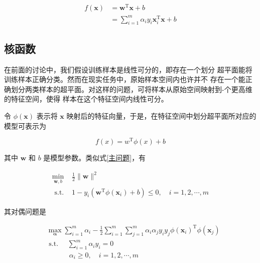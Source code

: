 \documentclass{ctexart}
\begin{document}
	\begin{equation}
		\begin{aligned}
			f(\boldsymbol{x}) &=\boldsymbol{w}^{\mathrm{T}} \boldsymbol{x}+b \\
			&=\sum_{i=1}^{m} \alpha_{i} y_{i} \boldsymbol{x}_{i}^{\mathrm{T}} \boldsymbol{x}+b
		\end{aligned}
	\end{equation}
	
		\subsection{核函数}
	
	在前面的讨论中，我们假设训练样本是线性可分的，即存在一个划分
	超平面能将训练样本正确分类。然而在现实任务中，原始样本空间内也许并不
	存在一个能正确划分两类样本的超平面。对这样的问题，可将样本从原始空间映射到-个更高维的特征空间，使得
	样本在这个特征空间内线性可分。
	
	令 $\phi(\boldsymbol{x})$ 表示将 $\boldsymbol{x}$ 映射后的特征向量，于是，在特征空间中划分超平面所对应的模型可表示为
	
	\begin{equation}
		f(x)=w^{\mathrm{T}} \phi(x)+b
	\end{equation}
	
	其中 $\boldsymbol{w}$ 和 $b$ 是模型参数。类似式\eqref{主问题}，有
	
	\begin{equation}
		\begin{array}{ll}
			\min\limits_{\boldsymbol{w}, b} & \frac{1}{2}\|\boldsymbol{w}\|^{2} \\
			\text { s.t. } &1- y_{i}\left(\boldsymbol{w}^{\mathrm{T}} \phi\left(\boldsymbol{x}_{i}\right)+b\right) \leqslant 0, \quad i=1,2, \cdots, m
		\end{array}
	\end{equation}
	
	其对偶问题是 
	
	\begin{equation}
		\begin{aligned}
			&\max _{\boldsymbol{\alpha}} \sum_{i=1}^{m} \alpha_{i}-\frac{1}{2} \sum_{i=1}^{m} \sum_{j=1}^{m} \alpha_{i} \alpha_{j} y_{i} y_{j} \phi(\boldsymbol{x}_{i})^{\mathrm{T}}\phi(\boldsymbol{x}_j) \\
			&\text { s.t. } \quad \sum_{i=1}^{m} \alpha_{i} y_{i}=0 \\
			&\ \quad\quad\quad \alpha_{i} \geqslant 0, \quad i=1,2, \cdots, m
		\end{aligned}
		\label{带映射的原问题}
	\end{equation}
	
\end{document}
